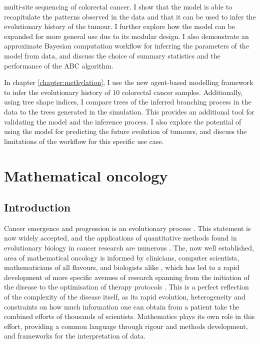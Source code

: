 multi-site sequencing of colorectal cancer. I show that the model is able to recapitulate the patterns observed in the
data and that it can be used to infer the evolutionary history of the tumour. I further explore how the model can be expanded
for more general use due to its modular design. I also demonstrate an approximate Bayesian computation workflow for inferring
the parameters of the model from data, and discuss the choice of summary statistics and the performance of the ABC algorithm.\par
In chapter \ref{chapter:methylation}, I use the new agent-based modelling framework to infer the evolutionary history of
$10$ colorectal cancer samples. Additionally, using tree shape indices, I compare trees of the inferred branching process in the data to the trees
generated in the simulation. This provides an additional tool for validating the model and the inference process. I also
explore the potential of using the model for predicting the future evolution of tumours, and discuss the limitations of the
workflow for this specific use case.\par


\section{Mathematical oncology}
\subsection{Introduction}
Cancer emergence and progression is an evolutionary process \cite{nowell_clonal_1976, merlo_cancer_2006}.
This statement is now widely accepted, and the applications of quantitative methods found in evolutionary
biology in cancer research are numerous \cite{rockne_2019_2019, yin_review_2019, kourou_applied_2021}.
The, now well established, area of mathematical oncology is informed by clinicians, computer scientists,
mathematicians of all flavours, and biologists alike \cite{bull_hallmarks_2022}, which has led to a rapid
development of more specific avenues of research spanning from the initiation of the disease
\cite{paterson_mathematical_2020} to the optimisation of therapy protocols
\cite{west_survey_2023}. This is a perfect reflection of the complexity
of the disease itself, as its rapid evolution, heterogeneity and constraints on
how much information one can obtain from a patient take
the combined efforts of thousands of scientists. Mathematics plays its own role in this effort, providing
a common language through rigour and methods development, and frameworks for the interpretation of data.

